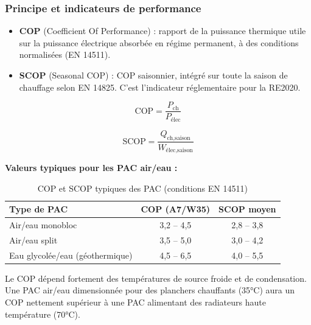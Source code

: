 \subsubsection{Principe et indicateurs de performance}

\begin{definition}[title=Coefficient de Performance — COP et SCOP]
\begin{itemize}
  \item \textbf{COP} (Coefficient Of Performance) : rapport de la puissance thermique utile sur la puissance électrique absorbée en régime permanent, à des conditions normalisées (EN 14511).
  \item \textbf{SCOP} (Seasonal COP) : COP saisonnier, intégré sur toute la saison de chauffage selon EN 14825. C'est l'indicateur réglementaire pour la RE2020.
\end{itemize}
\end{definition}

\begin{equation}
  \text{COP} = \frac{P_{\text{ch}}}{P_{\text{élec}}}
  \label{eq:cop}
\end{equation}

\begin{equation}
  \text{SCOP} = \frac{Q_{\text{ch,saison}}}{W_{\text{élec,saison}}}
  \label{eq:scop}
\end{equation}

\medskip
\noindent\textbf{Valeurs typiques pour les PAC air/eau :}

\begin{table}[H]
  \centering
  \begin{tabular}{lcc}
    \toprule
    Type de PAC & COP (A7/W35) & SCOP moyen \\
    \midrule
    Air/eau monobloc & 3,2 -- 4,5 & 2,8 -- 3,8 \\
    Air/eau split & 3,5 -- 5,0 & 3,0 -- 4,2 \\
    Eau glycolée/eau (géothermique) & 4,5 -- 6,5 & 4,0 -- 5,5 \\
    \bottomrule
  \end{tabular}
  \caption{COP et SCOP typiques des PAC (conditions EN 14511)}
\end{table}

\begin{attention}
Le COP dépend fortement des températures de source froide et de condensation. Une PAC air/eau dimensionnée pour des planchers chauffants (35°C) aura un COP nettement supérieur à une PAC alimentant des radiateurs haute température (70°C).
\end{attention}

